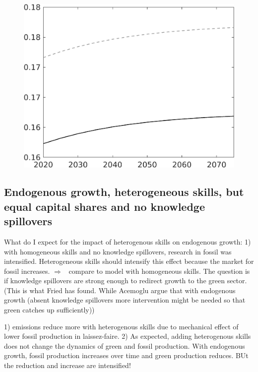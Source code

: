 \documentclass[12pt]{article}
\newcommand{\ar}{$\Rightarrow$ \ }
\begin{document}
\begin{figure}[h!!]
\begin{minipage}[]{0.32\textwidth}
	\end{minipage}	
	\begin{minipage}[]{0.32\textwidth}
		\includegraphics[width=1\textwidth]{../../codding_model/own_basedOnFried/optimalPol_010922_revision/figures/all_13Sept22/CompTaul_Equlab_LFBAU_Reg0_Ln_spillover0_nsk0_xgr1_knspil1_sep1_countec0_GovRev0_etaa0.79_lgd0.png}
	\end{minipage}	
\end{figure}

\clearpage \newpage
\subsection{Endogenous growth, heterogeneous skills, but equal capital shares and no knowledge spillovers}

What do I expect for the impact of heterogenous skills on endogenous growth: 1) with homogeneous skills and no knowledge spillovers, research in fossil was intensified. Heterogeneous skills should intensify this effect because the market for fossil increases. \ar compare to model with homogeneous skills. 
The question is if knowledge spillovers are strong enough to redirect growth to the green sector. (This is what Fried has found. While Acemoglu argue that with endogenous growth (absent knowledge spillovers more intervention might be needed so that green catches up sufficiently))

1) emissions reduce more with heterogenous skills due to mechanical effect of lower fossil production in laissez-faire. 
2) As expected, adding heterogenous skills does not change the dynamics of green and fossil production. With endogenous growth, fossil production increases over time and green production reduces. BUt the reduction and increase are intensified! 
\end{document}
